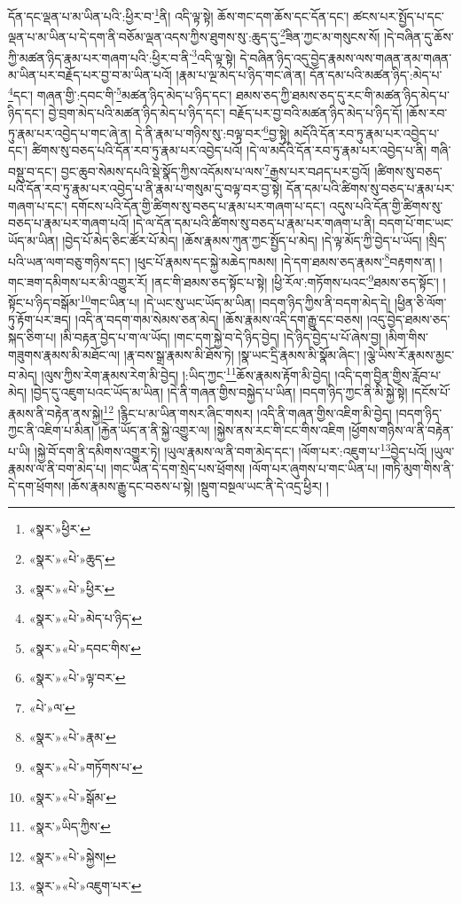 དོན་དང་ལྡན་པ་མ་ཡིན་པའི་:ཕྱིར་བ་\footnote{«སྣར་»ཕྱིར་}ནི། འདི་ལྟ་སྟེ། ཆོས་གང་དག་ཆོས་དང་དོན་དང་། ཚངས་པར་སྤྱོད་པ་དང་ལྡན་པ་མ་ཡིན་པ་དེ་དག་ནི་བཅོམ་ལྡན་འདས་ཀྱིས་ཐུགས་སུ་:ཆུད་དུ་\footnote{«སྣར་»«པེ་»ཆུད་}ཟིན་ཀྱང་མ་གསུངས་སོ། །དེ་བཞིན་དུ་ཆོས་ཀྱི་མཚན་ཉིད་རྣམ་པར་གཞག་པའི་:ཕྱིར་བ་ནི་\footnote{«སྣར་»«པེ་»ཕྱིར་}འདི་ལྟ་སྟེ། དེ་བཞིན་ཉིད་འདུ་བྱེད་རྣམས་ལས་གཞན་ནམ་གཞན་མ་ཡིན་པར་བརྗོད་པར་བྱ་བ་མ་ཡིན་པའོ། །རྣམ་པ་ལྔ་མེད་པ་ཉིད་གང་ཞེ་ན། དོན་དམ་པའི་མཚན་ཉིད་:མེད་པ་\footnote{«སྣར་»«པེ་»མེད་པ་ཉིད་}དང་། གཞན་གྱི་:དབང་གི་\footnote{«སྣར་»«པེ་»དབང་གིས་}མཚན་ཉིད་མེད་པ་ཉིད་དང་། ཐམས་ཅད་ཀྱི་ཐམས་ཅད་དུ་རང་གི་མཚན་ཉིད་མེད་པ་ཉིད་དང་། བྱེ་བྲག་མེད་པའི་མཚན་ཉིད་མེད་པ་ཉིད་དང་། བརྗོད་པར་བྱ་བའི་མཚན་ཉིད་མེད་པ་ཉིད་དོ། །ཆོས་རབ་ཏུ་རྣམ་པར་འབྱེད་པ་གང་ཞེ་ན། དེ་ནི་རྣམ་པ་གཉིས་སུ་:བལྟ་བར་\footnote{«སྣར་»«པེ་»ལྟ་བར་}བྱ་སྟེ། མདོའི་དོན་རབ་ཏུ་རྣམ་པར་འབྱེད་པ་དང་། ཚིགས་སུ་བཅད་པའི་དོན་རབ་ཏུ་རྣམ་པར་འབྱེད་པའོ། །དེ་ལ་མདོའི་དོན་རབ་ཏུ་རྣམ་པར་འབྱེད་པ་ནི། གཞི་བསྡུ་བ་དང་། བྱང་ཆུབ་སེམས་དཔའི་སྡེ་སྣོད་ཀྱིས་འདོམས་པ་ལས་\footnote{«པེ་»ལ་}རྒྱས་པར་བཤད་པར་བྱའོ། །ཚིགས་སུ་བཅད་པའི་དོན་རབ་ཏུ་རྣམ་པར་འབྱེད་པ་ནི་རྣམ་པ་གསུམ་དུ་བལྟ་བར་བྱ་སྟེ། དོན་དམ་པའི་ཚིགས་སུ་བཅད་པ་རྣམ་པར་གཞག་པ་དང་། དགོངས་པའི་དོན་གྱི་ཚིགས་སུ་བཅད་པ་རྣམ་པར་གཞག་པ་དང་། འདུས་པའི་དོན་གྱི་ཚིགས་སུ་བཅད་པ་རྣམ་པར་གཞག་པའོ། །དེ་ལ་དོན་དམ་པའི་ཚིགས་སུ་བཅད་པ་རྣམ་པར་གཞག་པ་ནི། བདག་པོ་གང་ཡང་ཡོད་མ་ཡིན། །བྱེད་པོ་མེད་ཅིང་ཚོར་པོ་མེད། །ཆོས་རྣམས་ཀུན་ཀྱང་སྤྱོད་པ་མེད། །དེ་ལྟ་མོད་ཀྱི་བྱེད་པ་ཡོད། །སྲིད་པའི་ཡན་ལག་བཅུ་གཉིས་དང་། །ཕུང་པོ་རྣམས་དང་སྐྱེ་མཆེད་ཁམས། །དེ་དག་ཐམས་ཅད་རྣམས་\footnote{«སྣར་»«པེ་»རྣམ་}བརྟགས་ན། །གང་ཟག་དམིགས་པར་མི་འགྱུར་རོ། །ནང་གི་ཐམས་ཅད་སྟོང་པ་སྟེ། །ཕྱི་རོལ་:གཏོགས་པའང་\footnote{«སྣར་»«པེ་»གཏོགས་པ་}ཐམས་ཅད་སྟོང་། །སྟོང་པ་ཉིད་བསྒོམ་\footnote{«སྣར་»«པེ་»སྒོམ་}གང་ཡིན་པ། །དེ་ཡང་སུ་ཡང་ཡོད་མ་ཡིན། །བདག་ཉིད་ཀྱིས་ནི་བདག་མེད་དེ། །ཕྱིན་ཅི་ལོག་ཏུ་རྟོག་པར་ཟད། །འདི་ན་བདག་གམ་སེམས་ཅན་མེད། །ཆོས་རྣམས་འདི་དག་རྒྱུ་དང་བཅས། །འདུ་བྱེད་ཐམས་ཅད་སྐད་ཅིག་པ། །མི་བརྟན་བྱེད་པ་ག་ལ་ཡོད། །གང་དག་སྐྱེ་བ་དེ་ཉིད་བྱེད། །དེ་ཉིད་བྱེད་པ་པོ་ཞེས་བྱ། །མིག་གིས་གཟུགས་རྣམས་མི་མཐོང་ལ། །རྣ་བས་སྒྲ་རྣམས་མི་ཐོས་ཏེ། །སྣ་ཡང་དྲི་རྣམས་མི་སྣོམ་ཞིང་། །ལྕེ་ཡིས་རོ་རྣམས་མྱང་བ་མེད། །ལུས་ཀྱིས་རེག་རྣམས་རེག་མི་བྱེད། །:ཡིད་ཀྱང་\footnote{«སྣར་»ཡིད་ཀྱིས་}ཆོས་རྣམས་རྟོག་མི་བྱེད། །འདི་དག་བྱིན་གྱིས་རློབ་པ་མེད། །བྱེད་དུ་འཇུག་པའང་ཡོད་མ་ཡིན། །དེ་ནི་གཞན་གྱིས་བསྐྱེད་པ་ཡིན། །བདག་ཉིད་ཀྱང་ནི་མི་སྐྱེ་སྟེ། །དངོས་པོ་རྣམས་ནི་བརྟེན་ནས་སྐྱེ།\footnote{«སྣར་»«པེ་»སྐྱེས།} །རྙིང་པ་མ་ཡིན་གསར་ཞིང་གསར། །འདི་ནི་གཞན་གྱིས་འཇིག་མི་བྱེད། །བདག་ཉིད་ཀྱང་ནི་འཇིག་པ་མིན། །རྐྱེན་ཡོད་ན་ནི་སྐྱེ་འགྱུར་ལ། །སྐྱེས་ནས་རང་གི་ངང་གིས་འཇིག །ཕྱོགས་གཉིས་ལ་ནི་བརྟེན་པ་ཡི། །སྐྱེ་བོ་དག་ནི་དམིགས་འགྱུར་ཏེ། །ཡུལ་རྣམས་ལ་ནི་བག་མེད་དང་། །ལོག་པར་:འཇུག་པ་\footnote{«སྣར་»«པེ་»འཇུག་པར་}བྱེད་པའོ། །ཡུལ་རྣམས་ལ་ནི་བག་མེད་པ། །གང་ཡིན་དེ་དག་སྲེད་པས་ཕྲོགས། །ལོག་པར་ཞུགས་པ་གང་ཡིན་པ། །གཏི་མུག་གིས་ནི་དེ་དག་ཕྲོགས། །ཆོས་རྣམས་རྒྱུ་དང་བཅས་པ་སྟེ། །སྡུག་བསྔལ་ཡང་ནི་དེ་འདྲ་ཕྱིར། །
